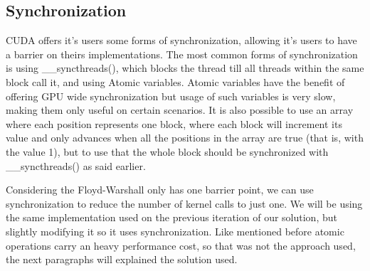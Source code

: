 \documentclass[conference]{IEEEtran}
\begin{document}

\subsection{Synchronization}

CUDA offers it's users some forms of synchronization, allowing it's users to have a barrier on theirs implementations.
The most common forms of synchronization is using \_\_syncthreads(), which blocks the thread till all threads within the same block call it, and using Atomic variables. Atomic variables have the benefit of offering GPU wide synchronization but usage of such variables is very slow, making them only useful on certain scenarios. It is also possible to use an array where each position represents one block, where each block will increment its value and only advances when all the positions in the array are true (that is, with the value 1), but to use that the whole block should be synchronized with \_\_syncthreads() as said earlier.

Considering the Floyd-Warshall only has one barrier point, we can use synchronization to reduce the number of kernel calls to just one.
We will be using the same implementation used on the previous iteration of our solution, but slightly modifying it so it uses synchronization.
Like mentioned before atomic operations carry an heavy performance cost, so that was not the approach used, the next paragraphs will explained the solution used.
\end{document}
